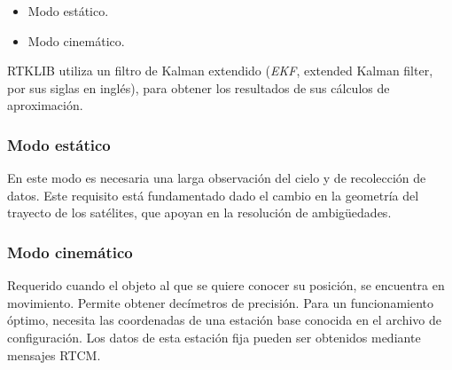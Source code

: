 \begin{itemize}
\item Modo estático.
\item Modo cinemático.
\end{itemize}

RTKLIB utiliza un filtro de Kalman extendido (\textit{EKF}, extended Kalman filter, por sus siglas en inglés), para obtener los resultados de sus cálculos de aproximación. 

\subsubsection{Modo estático}
En este modo es necesaria una larga observación del cielo y de recolección de datos. Este requisito está fundamentado dado el cambio en la geometría del trayecto de los satélites, que apoyan en la resolución de ambigüedades\cite{wisniewski2013evaluation}.

\subsubsection{Modo cinemático}
Requerido cuando el objeto al que se quiere conocer su posición, se encuentra en movimiento. Permite obtener decímetros de precisión. Para un funcionamiento óptimo, necesita las coordenadas de una estación base conocida en el archivo de configuración. Los datos de esta estación fija pueden ser obtenidos mediante mensajes RTCM\cite{wisniewski2013evaluation}.